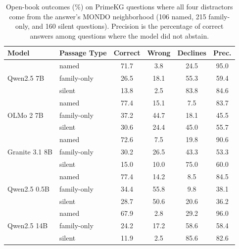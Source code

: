 \begin{table}[t]
\centering
\small
\setlength{\tabcolsep}{2.9pt}
\begin{tabular}{llcccc}
\toprule
Model & Passage Type & Correct & Wrong & Declines & Prec. \\
\midrule
\multirow{3}{*}{Qwen2.5 7B} & named & 71.7 & 3.8 & 24.5 & 95.0 \\
 & family-only & 26.5 & 18.1 & 55.3 & 59.4 \\
 & silent & 13.8 & 2.5 & 83.8 & 84.6 \\
\midrule
\multirow{3}{*}{OLMo 2 7B} & named & 77.4 & 15.1 & 7.5 & 83.7 \\
 & family-only & 37.2 & 44.7 & 18.1 & 45.5 \\
 & silent & 30.6 & 24.4 & 45.0 & 55.7 \\
\midrule
\multirow{3}{*}{Granite 3.1 8B} & named & 72.6 & 7.5 & 19.8 & 90.6 \\
 & family-only & 30.2 & 26.5 & 43.3 & 53.3 \\
 & silent & 15.0 & 10.0 & 75.0 & 60.0 \\
\midrule
\multirow{3}{*}{Qwen2.5 0.5B} & named & 77.4 & 14.2 & 8.5 & 84.5 \\
 & family-only & 34.4 & 55.8 & 9.8 & 38.1 \\
 & silent & 28.7 & 50.6 & 20.6 & 36.2 \\
\midrule
\multirow{3}{*}{Qwen2.5 14B} & named & 67.9 & 2.8 & 29.2 & 96.0 \\
 & family-only & 24.2 & 17.2 & 58.6 & 58.4 \\
 & silent & 11.9 & 2.5 & 85.6 & 82.6 \\
\bottomrule
\end{tabular}
\caption{Open-book outcomes (\%) on PrimeKG questions where all four distractors come from the answer's MONDO neighborhood (106 named, 215 family-only, and 160 silent questions). Precision is the percentage of correct answers among questions where the model did not abstain.}
\label{tab:outcomes}
\end{table}